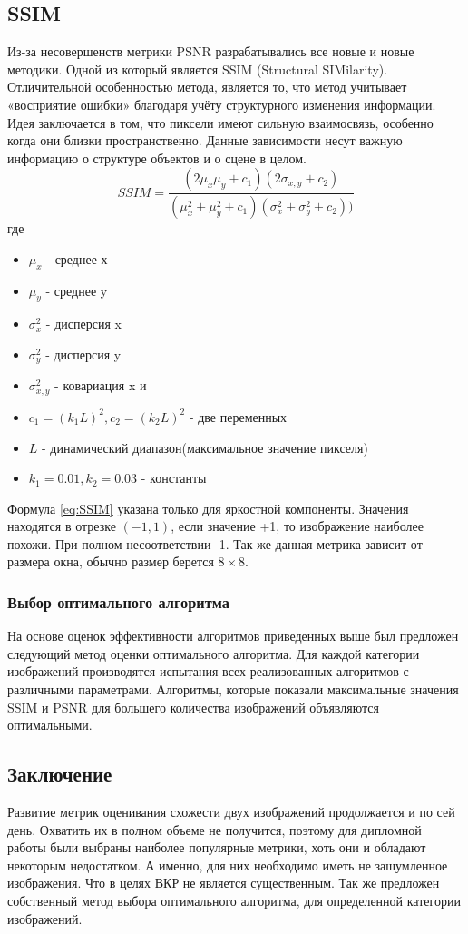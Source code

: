 \subsection{SSIM}
Из-за несовершенств метрики PSNR разрабатывались все новые и новые методики. Одной из который является SSIM (Structural SIMilarity). Отличительной особенностью метода, является то, что метод учитывает «восприятие ошибки» благодаря учёту структурного изменения информации. Идея заключается в том, что пиксели имеют сильную взаимосвязь, особенно когда они близки пространственно. Данные зависимости несут важную информацию о структуре объектов и о сцене в целом\cite{ssim}.
\begin{equation}\label{eq:SSIM}
SSIM = \frac{(2\mu_x\mu_y+c_1)(2\sigma_{x,y}+c_2)}{(\mu_x^2+\mu_y^2+c_1)(\sigma_x^2+\sigma_y^2+c_2))}
\end{equation}
где
\begin{itemize}
	\item $\mu_x$ - среднее х
	\item $\mu_y$ - среднее y
	\item $\sigma_x^2$ - дисперсия x
	\item $\sigma_y^2$ - дисперсия y
	\item $\sigma_{x,y}^2$ - ковариация x и \item $c_1=(k_1L)^2, c_2=(k_2L)^2$ - две переменных
	\item $L$ - динамический диапазон(максимальное значение пикселя)  
	\item $k_1=0.01, k_2=0.03$ - константы
\end{itemize}
Формула \ref{eq:SSIM} указана только для яркостной компоненты. Значения находятся в отрезке $(-1,1)$, если значение +1, то изображение наиболее похожи. При полном несоответствии -1. Так же данная метрика зависит от размера окна, обычно размер берется $8\times8$.\

\subsubsection{Выбор оптимального алгоритма}
На основе оценок эффективности алгоритмов приведенных выше был предложен следующий метод оценки оптимального алгоритма. Для каждой категории изображений производятся испытания всех реализованных алгоритмов с различными параметрами. Алгоритмы, которые показали максимальные значения SSIM и PSNR для большего количества изображений объявляются оптимальными.

\subsection{Заключение}
Развитие метрик оценивания схожести двух изображений продолжается и по сей день. Охватить их в полном объеме не получится, поэтому для дипломной работы были выбраны наиболее популярные метрики, хоть они и обладают некоторым недостатком. А именно, для них необходимо иметь не зашумленное изображения. Что в целях ВКР не является существенным.
Так же предложен собственный метод выбора оптимального алгоритма, для определенной категории изображений.